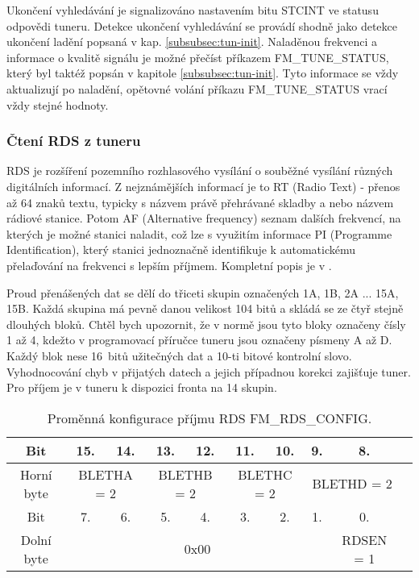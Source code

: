 Ukončení vyhledávání je signalizováno nastavením bitu STCINT ve statusu odpovědi tuneru. Detekce ukončení vyhledávání se provádí shodně jako detekce ukončení ladění popsaná v kap. \ref{subsubsec:tun-init}. Naladěnou frekvenci a informace o kvalitě signálu je možné přečíst příkazem FM\_TUNE\_STATUS, který byl taktéž popsán v kapitole \ref{subsubsec:tun-init}. Tyto informace se vždy aktualizují po naladění, opětovné volání příkazu FM\_TUNE\_STATUS vrací vždy stejné hodnoty. 


\subsubsection{Čtení RDS z tuneru}
RDS je rozšíření pozemního rozhlasového vysílání o souběžné vysílání různých digitálních informací. Z nejznámějších informací je to RT (Radio Text) - přenos až 64 znaků textu, typicky s názvem právě přehrávané skladby a nebo názvem rádiové stanice. Potom AF  (Alternative frequency) seznam dalších frekvencí, na kterých je možné stanici naladit, což lze s využitím informace PI (Programme Identification), který stanici jednoznačně identifikuje k automatickému přelaďování na frekvenci s lepším příjmem. Kompletní popis je v \cite{rds}.

Proud přenášených dat se dělí do třiceti skupin označených 1A, 1B, 2A ... 15A, 15B. Každá skupina má pevně danou velikost 104 bitů a skládá se ze čtyř stejně dlouhých bloků. Chtěl bych upozornit, že v normě \cite{rds} jsou tyto bloky označeny čísly 1 až 4, kdežto v programovací příručce tuneru \cite{tuner-programing} jsou označeny písmeny A až D. Každý blok nese 16~bitů užitečných dat a 10-ti bitové kontrolní slovo. Vyhodnocování chyb v přijatých datech a jejich případnou korekci zajišťuje tuner. Pro příjem je v tuneru k dispozici fronta na 14 skupin.

\begin{table}[ht!]
\begin{center}
\begin{tabular}{|c|c|c|c|c|c|c|c|c|c|}
\hline 
Bit & 15. & 14. & 13. & 12. & 11. & 10. & 9. & 8. \\  
\hline 
Horní byte & \multicolumn{2}{c|}{BLETHA = 2} & \multicolumn{2}{c|}{BLETHB = 2} & \multicolumn{2}{c|}{BLETHC = 2} & \multicolumn{2}{c|}{BLETHD = 2} \\ 
\hline 
Bit & 7. & 6. & 5. & 4. & 3. & 2. & 1. & 0. \\
\hline 
Dolní byte & \multicolumn{7}{c|}{0x00} & RDSEN = 1 \\ 
\hline 
\end{tabular} 
\end{center}
\caption{Proměnná konfigurace příjmu RDS FM\_RDS\_CONFIG.}
\label{tab:tuner-rds-config} 
\end{table}

